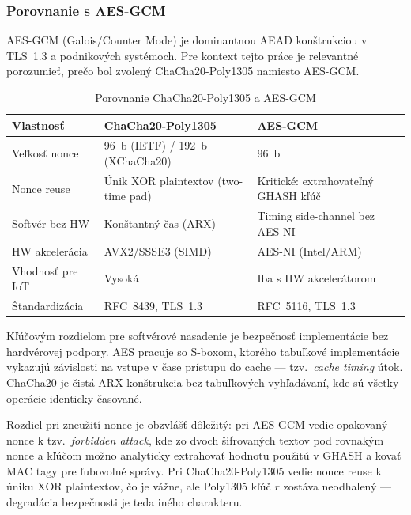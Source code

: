 \documentclass[journal,a4paper,onecolumn]{IEEEtran}
\begin{document}
\subsubsection{Porovnanie s AES-GCM}

AES-GCM (Galois/Counter Mode) je dominantnou AEAD konštrukciou v TLS~1.3 a podnikových systémoch\cite{RFC8446}. Pre kontext tejto práce je relevantné porozumieť, prečo bol zvolený ChaCha20-Poly1305 namiesto AES-GCM.

\begin{table}[htbp]
\renewcommand{\arraystretch}{1.3}
\centering
\caption{Porovnanie ChaCha20-Poly1305 a AES-GCM}
\label{tab:chacha-vs-aesgcm}
\small
\begin{tabular}{p{3.2cm} p{4.5cm} p{4.5cm}}
\toprule
\textbf{Vlastnosť} & \textbf{ChaCha20-Poly1305} & \textbf{AES-GCM} \\
\midrule
Veľkosť nonce & 96~b (IETF) / 192~b (XChaCha20) & 96~b \\
Nonce reuse & Únik XOR plaintextov (two-time pad) & Kritické: extrahovateľný GHASH kľúč\cite{RFC5116} \\
Softvér bez HW & Konštantný čas (ARX)\cite{Bernstein2012} & Timing side-channel bez AES-NI \\
HW akcelerácia & AVX2/SSSE3 (SIMD) & AES-NI (Intel/ARM) \\
Vhodnosť pre IoT & Vysoká & Iba s HW akcelerátorom \\
Štandardizácia & RFC~8439, TLS~1.3 & RFC~5116, TLS~1.3 \\
\bottomrule
\end{tabular}
\end{table}

Kľúčovým rozdielom pre softvérové nasadenie je bezpečnosť implementácie bez hardvérovej podpory. AES pracuje so S-boxom, ktorého tabuľkové implementácie vykazujú závislosti na vstupe v čase prístupu do cache --- tzv.\ \emph{cache timing} útok\cite{Bernstein2012}. ChaCha20 je čistá ARX konštrukcia bez tabuľkových vyhľadávaní, kde sú všetky operácie identicky časované.

Rozdiel pri zneužití nonce je obzvlášť dôležitý: pri AES-GCM vedie opakovaný nonce k tzv.\ \emph{forbidden attack}, kde zo dvoch šifrovaných textov pod rovnakým nonce a kľúčom možno analyticky extrahovať hodnotu použitú v GHASH a kovať MAC tagy pre ľubovoľné správy\cite{RFC5116}. Pri ChaCha20-Poly1305 vedie nonce reuse k úniku XOR plaintextov, čo je vážne, ale Poly1305 kľúč $r$ zostáva neodhalený --- degradácia bezpečnosti je teda iného charakteru.
\end{document}
